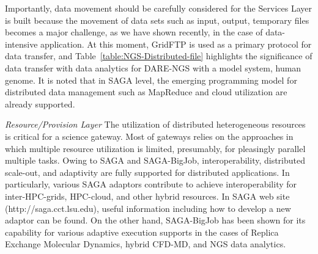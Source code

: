 \documentclass{sig-alternate}
\begin{document}
Importantly, data movement should be carefully considered for the Services Layer is built because the movement of data sets such as input, output, temporary files becomes a major challenge, as we have shown recently, in the case of data-intensive application\cite{ecmls11}. At this moment, GridFTP is used as a primary protocol for data transfer, and Table~\ref{table:NGS-Distributed-file} highlights the significance of data transfer with data analytics for DARE-NGS with a model system, human genome.  It is noted that in SAGA level, the emerging programming model for distributed data management such as MapReduce and cloud utilization are already supported\cite{abstractions-azure,saga-ccgrid10}.

%

\textit{Resource/Provision Layer}
The utilization of distributed heterogeneous resources is critical for a science gateway.  Most of gateways relies on the approaches in which multiple resource utilization is limited, presumably, for pleasingly parallel multiple tasks.  Owing to SAGA and SAGA-BigJob, interoperability, distributed scale-out, and adaptivity are fully supported for distributed applications.  In particularly, various SAGA adaptors contribute to achieve interoperability for inter-HPC-grids, HPC-cloud, and other hybrid resources.  In SAGA web site (http://saga.cct.lsu.edu), useful information including how to develop a new adaptor can be found.  On the other hand, SAGA-BigJob has been shown for its capability for various adaptive execution supports in the cases of Replica Exchange Molecular Dynamics, hybrid CFD-MD, and NGS data analytics\cite{saga-royalsoc,coupled,ecmls11}.    
\end{document}
